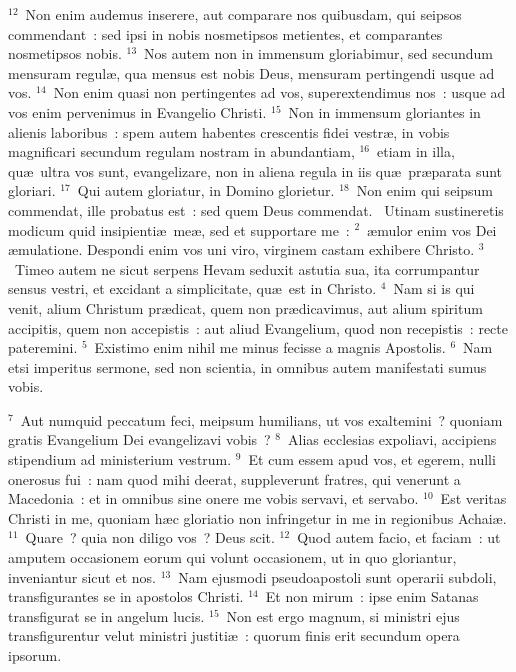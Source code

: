 ${}^{12}$~Non enim audemus inserere, aut comparare nos quibusdam, qui seipsos commendant~: sed ipsi in nobis nosmetipsos metientes, et comparantes nosmetipsos nobis.
${}^{13}$~Nos autem non in immensum gloriabimur, sed secundum mensuram regul\ae , qua mensus est nobis Deus, mensuram pertingendi usque ad vos.
${}^{14}$~Non enim quasi non pertingentes ad vos, superextendimus nos~: usque ad vos enim pervenimus in Evangelio Christi.
${}^{15}$~Non in immensum gloriantes in alienis laboribus~: spem autem habentes crescentis fidei vestr\ae , in vobis magnificari secundum regulam nostram in abundantiam,
${}^{16}$~etiam in illa, qu\ae\ ultra vos sunt, evangelizare, non in aliena regula in iis qu\ae\ pr\ae parata sunt gloriari.
${}^{17}$~Qui autem gloriatur, in Domino glorietur.
${}^{18}$~Non enim qui seipsum commendat, ille probatus est~: sed quem Deus commendat.
~\lettrine[lines=10,image=true,loversize=0.05,lraise=-0.03]{U}{}tinam sustineretis modicum quid insipienti\ae\ me\ae , sed et supportare me~:
${}^{2}$~\ae mulor enim vos Dei \ae mulatione. Despondi enim vos uni viro, virginem castam exhibere Christo.
${}^{3}$~Timeo autem ne sicut serpens Hevam seduxit astutia sua, ita corrumpantur sensus vestri, et excidant a simplicitate, qu\ae\ est in Christo.
${}^{4}$~Nam si is qui venit, alium Christum pr\ae dicat, quem non pr\ae dicavimus, aut alium spiritum accipitis, quem non accepistis~: aut aliud Evangelium, quod non recepistis~: recte pateremini.
${}^{5}$~Existimo enim nihil me minus fecisse a magnis Apostolis.
${}^{6}$~Nam etsi imperitus sermone, sed non scientia, in omnibus autem manifestati sumus vobis.


${}^{7}$~Aut numquid peccatum feci, meipsum humilians, ut vos exaltemini~? quoniam gratis Evangelium Dei evangelizavi vobis~?
${}^{8}$~Alias ecclesias expoliavi, accipiens stipendium ad ministerium vestrum.
${}^{9}$~Et cum essem apud vos, et egerem, nulli onerosus fui~: nam quod mihi deerat, suppleverunt fratres, qui venerunt a Macedonia~: et in omnibus sine onere me vobis servavi, et servabo.
${}^{10}$~Est veritas Christi in me, quoniam h\ae c gloriatio non infringetur in me in regionibus Achai\ae .
${}^{11}$~Quare~? quia non diligo vos~? Deus scit.
${}^{12}$~Quod autem facio, et faciam~: ut amputem occasionem eorum qui volunt occasionem, ut in quo gloriantur, inveniantur sicut et nos.
${}^{13}$~Nam ejusmodi pseudoapostoli sunt operarii subdoli, transfigurantes se in apostolos Christi.
${}^{14}$~Et non mirum~: ipse enim Satanas transfigurat se in angelum lucis.
${}^{15}$~Non est ergo magnum, si ministri ejus transfigurentur velut ministri justiti\ae~: quorum finis erit secundum opera ipsorum.


